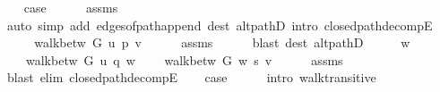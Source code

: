 \begin{isabellebody}
\ \ \isamarkupfalse%
\ {\isacharquery}{\kern0pt}case\isanewline
\ \ \ \ \isamarkupfalse%
\ assms\isanewline
\ \ \ \ \isamarkupfalse%
\ {\isacharparenleft}{\kern0pt}auto\ simp\ add{\isacharcolon}{\kern0pt}\ edges{\isacharunderscore}{\kern0pt}of{\isacharunderscore}{\kern0pt}path{\isacharunderscore}{\kern0pt}append{\isacharunderscore}{\kern0pt}{}\ dest{\isacharcolon}{\kern0pt}\ alt{\isacharunderscore}{\kern0pt}pathD{\isacharparenleft}{\kern0pt}{}{\isacharparenright}{\kern0pt}\ intro{\isacharcolon}{\kern0pt}\ closed{\isacharunderscore}{\kern0pt}path{\isacharunderscore}{\kern0pt}decompE{\isacharunderscore}{\kern0pt}{}{\isacharparenright}{\kern0pt}\isanewline
{}\isamarkupfalse%
\isanewline
\ \ \isamarkupfalse%
\ {}\isanewline
\ \ \isamarkupfalse%
\ {\isachardoublequoteopen}walk{\isacharunderscore}{\kern0pt}betw\ G\ u\ p\ v{\isachardoublequoteclose}\isanewline
\ \ \ \ \isamarkupfalse%
\ assms{\isacharparenleft}{\kern0pt}{}{\isacharparenright}{\kern0pt}\isanewline
\ \ \ \ \isamarkupfalse%
\ {\isacharparenleft}{\kern0pt}blast\ dest{\isacharcolon}{\kern0pt}\ alt{\isacharunderscore}{\kern0pt}pathD{\isacharparenleft}{\kern0pt}{}{\isacharparenright}{\kern0pt}{\isacharparenright}{\kern0pt}\isanewline
\ \ \isamarkupfalse%
\ \isamarkupfalse%
\ w\ \isanewline
\ \ \ \ {\isachardoublequoteopen}walk{\isacharunderscore}{\kern0pt}betw\ G\ u\ q\ w{\isachardoublequoteclose}\isanewline
\ \ \ \ {\isachardoublequoteopen}walk{\isacharunderscore}{\kern0pt}betw\ G\ w\ s\ v{\isachardoublequoteclose}\isanewline
\ \ \ \ \isamarkupfalse%
\ assms{\isacharparenleft}{\kern0pt}{}{\isacharminus}{\kern0pt}{}{\isacharparenright}{\kern0pt}\isanewline
\ \ \ \ \isamarkupfalse%
\ {\isacharparenleft}{\kern0pt}blast\ elim{\isacharcolon}{\kern0pt}\ closed{\isacharunderscore}{\kern0pt}path{\isacharunderscore}{\kern0pt}decompE{\isacharunderscore}{\kern0pt}{}{\isacharparenright}{\kern0pt}\isanewline
\ \ \isamarkupfalse%
\ {\isacharquery}{\kern0pt}case\isanewline
\ \ \ \ \isamarkupfalse%
\ {\isacharparenleft}{\kern0pt}intro\ walk{\isacharunderscore}{\kern0pt}transitive{\isacharparenright}{\kern0pt}\isanewline
{}\isamarkupfalse%
%
\endisatagproof
{\isafoldproof}%
%
\isadelimproof
%
\endisadelimproof
%
\begin{isamarkuptext}%

\end{isamarkuptext}
\end{isabellebody}
